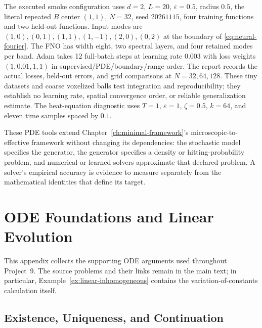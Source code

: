 \documentclass[12pt,a4paper,oneside]{book}
\begin{document}
The executed smoke configuration uses $d=2$, $L=20$, $\varepsilon=0.5$, radius $0.5$, the literal repeated
$B$ center $(1,1)$, $N=32$, seed $20261115$, four training functions and two held-out functions.
Input modes are $(1,0),(0,1),(1,1),(1,-1),(2,0),(0,2)$ at the boundary of \eqref{eq:neural-fourier}.
The FNO has width eight, two spectral layers, and four retained modes per band. Adam takes 12 full-batch steps at
learning rate $0.003$ with loss weights $(1,0.01,1,1)$ in supervised/PDE/boundary/range order.
The report records the actual losses, held-out errors, and grid comparisons at $N=32,64,128$.
These tiny datasets and coarse voxelized balls test integration and reproducibility; they establish no learning rate,
spatial convergence order, or reliable generalization estimate. The heat-equation diagnostic uses
$T=1$, $\varepsilon=1$, $\zeta=0.5$, $k=64$, and eleven time samples spaced by $0.1$.

These PDE tools extend Chapter~\ref{ch:minimal-framework}'s microscopic-to-effective framework without changing its dependencies:
the stochastic model specifies the generator, the generator specifies a density or hitting-probability problem,
and numerical or learned solvers approximate that declared problem. A solver's empirical accuracy is evidence to
measure separately from the mathematical identities that define its target.

\clearpage
\appendix
\chapter{ODE Foundations and Linear Evolution}
\label{app:ode-foundations}\label{app:linear-ode}

This appendix collects the supporting ODE arguments used throughout Project~9. The source problems and their links remain
in the main text; in particular, Example~\ref{ex:linear-inhomogeneous} contains the variation-of-constants calculation
itself.

\section{Existence, Uniqueness, and Continuation}
\label{app:picard-proof}
\end{document}
